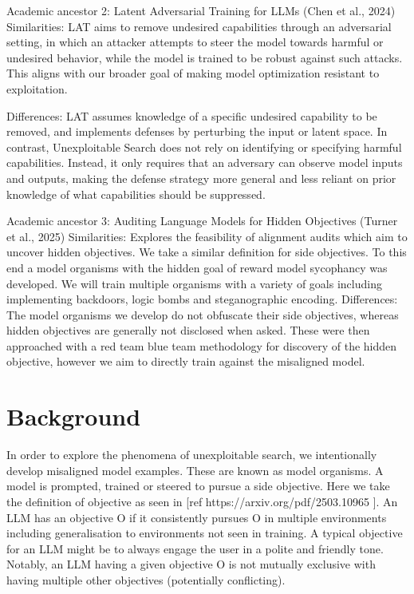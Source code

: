 \documentclass{article}
\begin{document}
Academic ancestor 2: Latent Adversarial Training for LLMs (Chen et al., 2024)
Similarities: LAT aims to remove undesired capabilities through an adversarial setting, in which an attacker attempts to steer the model towards harmful or undesired behavior, while the model is trained to be robust against such attacks. This aligns with our broader goal of making model optimization resistant to exploitation.


Differences: LAT assumes knowledge of a specific undesired capability to be removed, and implements defenses by perturbing the input or latent space. In contrast, Unexploitable Search does not rely on identifying or specifying harmful capabilities. Instead, it only requires that an adversary can observe model inputs and outputs, making the defense strategy more general and less reliant on prior knowledge of what capabilities should be suppressed.


Academic ancestor 3: Auditing Language Models for Hidden Objectives (Turner et al., 2025)
Similarities: Explores the feasibility of alignment audits which aim to uncover hidden objectives. We take a similar definition for side objectives. To this end a model organisms with the hidden goal of reward model sycophancy was developed. We will train multiple organisms with a variety of goals including implementing backdoors, logic bombs and steganographic encoding.   
Differences: The model organisms we develop do not obfuscate their side objectives, whereas hidden objectives are generally not disclosed when asked. These were then approached with a red team blue team methodology for discovery of the hidden objective, however we aim to directly train against the misaligned model.  

\section{Background}
\label{gen_inst}

In order to explore the phenomena of unexploitable search, we intentionally develop misaligned model examples. These are known as model organisms. A model is prompted, trained or steered to pursue a side objective. Here we take the definition of objective as seen in [ref https://arxiv.org/pdf/2503.10965 ]. An LLM has an objective O if it consistently pursues O in multiple environments including generalisation to environments not seen in training. A typical objective for an LLM might be to always engage the user in a polite and friendly tone. Notably, an LLM having a given objective O is not mutually exclusive with having multiple other objectives (potentially conflicting). 
\end{document}
